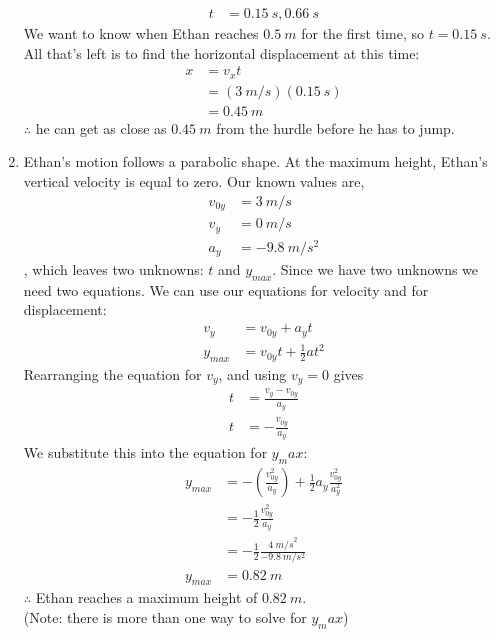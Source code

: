 \begin{enumerate}[label=\alph*)]
\begin{align*}
t&=\SI{0.15}{s}, \SI{0.66}{s}
\end{align*}
We want to know when Ethan reaches $\SI{0.5}{m}$ for the first time, so $t=\SI{0.15}{s}$. All that's left is to find the horizontal displacement at this time:
\begin{align*}
x&=v_xt\\
&=(\SI{3}{m/s})(\SI{0.15}{s})\\
&=\SI{0.45}{m}
\end{align*}
$\therefore$ he can get as close as $\SI{0.45}{m}$ from the hurdle before he has to jump.
\item Ethan's motion follows a parabolic shape. At the maximum height, Ethan's vertical velocity is equal to zero. Our known values are,
\begin{align*}
v_{0y}&=\SI{3}{m/s}\\
v_y&=\SI{0}{m/s}\\
a_y&=\SI{-9.8}{m/s^2}
\end{align*}
, which leaves two unknowns: $t$ and $y_{max}$. Since we have two unknowns we need two equations. We can use our equations for velocity and for displacement:
\begin{align*}
v_y&=v_{0y}+a_yt\\
y_{max}&=v_{0y}t+\frac{1}{2}at^2
\end{align*}
Rearranging the equation for $v_y$, and using $v_y=0$ gives
\begin{align*}
t&=\frac{v_y-v_{0y}}{a_y}\\
t&=-\frac{v_{0y}}{a_y}
\end{align*}
We substitute this into the equation for $y_max$:
\begin{align*}
y_{max}&=-(\frac{v_{0y}^2}{a_y})+\frac{1}{2}a_y\frac{v_{0y}^2}{a_y^2}\\
&=-\frac{1}{2}\frac{v_{0y}^2}{a_y}\\
&=-\frac{1}{2}\frac{\SI{4}{m/s}^2}{\SI{-9.8}{m/s^2}}\\
y_{max}&=\SI{0.82}{m}
\end{align*}
$\therefore$ Ethan reaches a maximum height of $\SI{0.82}{m}$. \\

(Note: there is more than one way to solve for $y_max$)
\end{enumerate}


